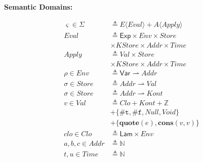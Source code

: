 \documentclass[12pt,draft]{article}
\newcommand{\truesyn}{\texttt{\#t}}
\newcommand{\falsesyn}{\texttt{\#f}}
\begin{document}
{\begin{multicols*}{2}
\vfill\null
\columnbreak


\begin{center}
\textbf{Semantic Domains:}
\end{center}
\vspace{-18mm}
\begin{center}
\begin{align*}
\varsigma \in \Sigma &\triangleq E\langle\textit{Eval}\rangle
								+ A\langle\textit{Apply}\rangle \\
  \textit{Eval} &\triangleq
                  \textsf{Exp} \times \textit{Env} \times \textit{Store} \\
                     & \times \textit{KStore} \times \textit{Addr} \times \textit{Time} \\
  \textit{Apply} &\triangleq
                   \textit{Val} \times \textit{Store} \\
                     & \times \textit{KStore} \times \textit{Addr} \times \textit{Time} \\
  \rho \in \textit{Env} &\triangleq \textsf{Var} \rightharpoonup
	  											\textit{Addr} \\
  \sigma \in \textit{Store} &\triangleq \textit{Addr} \rightharpoonup
                              \textit{Val} \\
  \sigma \in \textit{Store} &\triangleq \textit{Addr} \rightharpoonup
                              \textit{Kont} \\
v \in \textit{Val} &\triangleq \textit{Clo} + \textit{Kont} + \mathbb{Z} \\
				&+ \{ \truesyn,\falsesyn, \textit{Null} , \textit{Void} \} \\
				&+ \{\textbf{quote}(e) , \textbf{cons}(v, v)\} \\
clo \in \textit{Clo} &\triangleq \textsf{Lam} \times \textit{Env} \\
a,b,c \in \textit{Addr} &\triangleq \mathbb{N} \\
t,u \in \textit{Time} &\triangleq \mathbb{N} \\

\end{align*}
\end{center}
\end{multicols*}}
\end{document}
